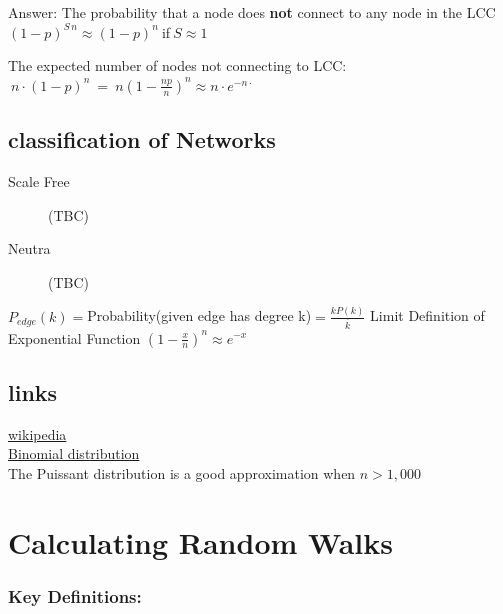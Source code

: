 \documentclass{article}
\begin{document}
Answer: The probability that a node does \textbf{not} connect to any node in the LCC $(1-p)^{S \, n}\approx(1-p)^n\:$if$\:S\approx1$

The expected number of nodes not connecting to LCC:
$\:n\cdot(1-p)^n\:=\:n(1-\frac{np}{n})^n\approx n\cdot e^{-n\cdotp}$

\subsection{classification of Networks}
\begin{description}
    \item[Scale Free] (TBC)
    \item[Neutra] (TBC)
\end{description}
$P_{edge}(k)= $Probability(given edge has degree k)$=\frac{kP(k)}{\overline{k}}$
Limit Definition of Exponential Function $(1-\frac{x}{n})^n\approx e^{-x}$
\subsection{links}
\href{https://en.wikipedia.org/wiki/Erd%C5%91s%E2%80%93R%C3%A9nyi_model}{wikipedia}\\
\href{https://en.wikipedia.org/wiki/Binomial_distribution}{Binomial distribution}\\
The Puissant distribution is a good approximation when $n>1,000$

\section{Calculating Random Walks}

\subsubsection{\textbf{Key Definitions}:}
\end{document}

